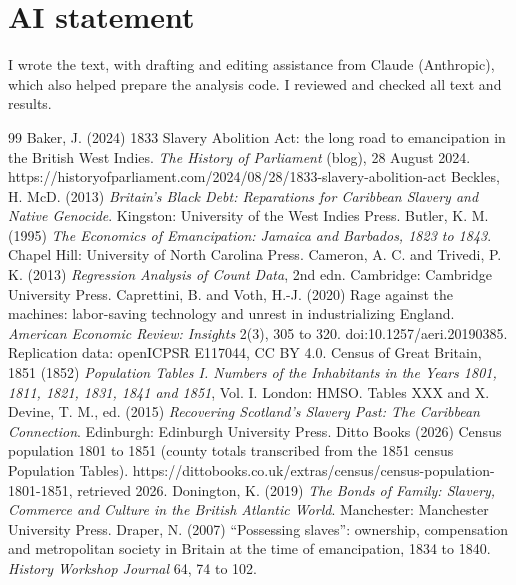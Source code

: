 \documentclass[11pt,a4paper]{article}
\begin{document}
\section*{AI statement}
I wrote the text, with drafting and editing assistance from Claude (Anthropic), which also helped prepare the analysis code. I reviewed and checked all text and results.

\begin{thebibliography}{99}
 Baker, J. (2024) 1833 Slavery Abolition Act: the long road to emancipation in the British West Indies. \textit{The History of Parliament} (blog), 28 August 2024. https://historyofparliament.com/2024/08/28/1833-slavery-abolition-act
 Beckles, H. McD. (2013) \textit{Britain's Black Debt: Reparations for Caribbean Slavery and Native Genocide}. Kingston: University of the West Indies Press.
 Butler, K. M. (1995) \textit{The Economics of Emancipation: Jamaica and Barbados, 1823 to 1843}. Chapel Hill: University of North Carolina Press.
 Cameron, A. C. and Trivedi, P. K. (2013) \textit{Regression Analysis of Count Data}, 2nd edn. Cambridge: Cambridge University Press.
 Caprettini, B. and Voth, H.-J. (2020) Rage against the machines: labor-saving technology and unrest in industrializing England. \textit{American Economic Review: Insights} 2(3), 305 to 320. doi:10.1257/aeri.20190385. Replication data: openICPSR E117044, CC BY 4.0.
 Census of Great Britain, 1851 (1852) \textit{Population Tables I. Numbers of the Inhabitants in the Years 1801, 1811, 1821, 1831, 1841 and 1851}, Vol. I. London: HMSO. Tables XXX and X.
 Devine, T. M., ed. (2015) \textit{Recovering Scotland's Slavery Past: The Caribbean Connection}. Edinburgh: Edinburgh University Press.
 Ditto Books (2026) Census population 1801 to 1851 (county totals transcribed from the 1851 census Population Tables). https://dittobooks.co.uk/extras/census/census-population-1801-1851, retrieved 2026.
 Donington, K. (2019) \textit{The Bonds of Family: Slavery, Commerce and Culture in the British Atlantic World}. Manchester: Manchester University Press.
 Draper, N. (2007) ``Possessing slaves'': ownership, compensation and metropolitan society in Britain at the time of emancipation, 1834 to 1840. \textit{History Workshop Journal} 64, 74 to 102.

\end{thebibliography}
\end{document}
